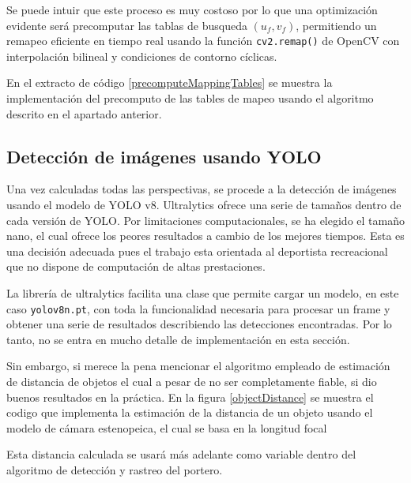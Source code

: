 Se puede intuir que este proceso es muy costoso por lo que una optimización evidente será precomputar las tablas de busqueda $(u_f, v_f)$, permitiendo un remapeo eficiente en tiempo real usando la función \verb|cv2.remap()| de OpenCV con interpolación bilineal y condiciones de contorno cíclicas.

En el extracto de código \ref{precomputeMappingTables} se muestra la implementación del precomputo de las tables de mapeo usando el algoritmo descrito en el apartado anterior.


\subsection{Detección de imágenes usando YOLO}
Una vez calculadas todas las perspectivas, se procede a la detección de imágenes usando el modelo de YOLO v8. Ultralytics ofrece una serie de tamaños dentro de cada versión de YOLO. Por limitaciones computacionales, se ha elegido el tamaño nano, el cual ofrece los peores resultados a cambio de los mejores tiempos. Esta es una decisión adecuada pues el trabajo esta orientada al deportista recreacional que no dispone de computación de altas prestaciones.

La librería de ultralytics facilita una clase que permite cargar un modelo, en este caso \verb|yolov8n.pt|, con toda la funcionalidad necesaria para procesar un frame y obtener una serie de resultados describiendo las detecciones encontradas. Por lo tanto, no se entra en mucho detalle de implementación en esta sección.

Sin embargo, si merece la pena mencionar el algoritmo empleado de estimación de distancia de objetos el cual a pesar de no ser completamente fiable, si dio buenos resultados en la práctica. En la figura \ref{objectDistance} se muestra el codigo que implementa la estimación de la distancia de un objeto usando el modelo de cámara estenopeica, el cual se basa en la longitud focal


Esta distancia calculada se usará más adelante como variable dentro del algoritmo de detección y rastreo del portero.

